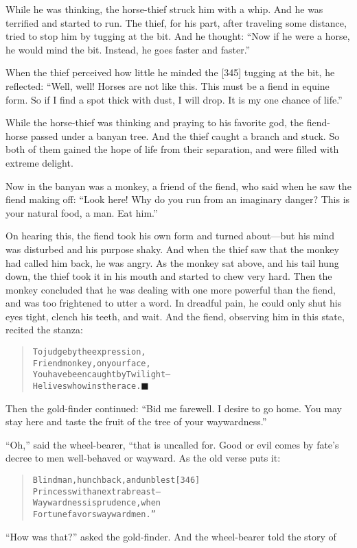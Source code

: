\documentclass[article, twoside, 14pt]{memoir}
\newcommand{\qed}{\hfill \ensuremath{\blacksquare}}
\renewenvironment{verbatim}{%
\begin{quote}%
\vskip -10pt%
\begin{alltt}\normalfont\large}{\end{alltt}%
\end{quote}%
\vskip -10pt
} %
\begin{document}
While he was thinking, the horse-thief struck him with a whip. And
he was terrified and started to run. The thief, for his part, after
traveling some distance, tried to stop him by tugging at the bit.
And he thought:
``Now if he were a horse, he would mind the bit. Instead, he goes faster and faster.''

When the thief perceived how little he minded the [345] tugging at
the bit, he reflected:
``Well, well! Horses are not like this. This must be a fiend in equine form. So if I find a spot thick with dust, I will drop. It is my one chance of life.''

While the horse-thief was thinking and praying to his favorite god,
the fiend-horse passed under a banyan tree. And the thief caught a
branch and stuck. So both of them gained the hope of life from
their separation, and were filled with extreme delight.

Now in the banyan was a monkey, a friend of the fiend, who said
when he saw the fiend making off:
``Look here! Why do you run from an imaginary danger? This is your natural food, a man. Eat him.''

On hearing this, the fiend took his own form and turned about---but
his mind was disturbed and his purpose shaky. And when the thief
saw that the monkey had called him back, he was angry. As the
monkey sat above, and his tail hung down, the thief took it in his
mouth and started to chew very hard. Then the monkey concluded that
he was dealing with one more powerful than the fiend, and was too
frightened to utter a word. In dreadful pain, he could only shut
his eyes tight, clench his teeth, and wait. And the fiend,
observing him in this state, recited the stanza:

\begin{verbatim}
To judge by the expression,
    Friend monkey, on your face,
You have been caught by Twilight--
    He lives who wins the race.\hyperref[s88]{\qed}
\end{verbatim}
Then the gold-finder continued:
``Bid me farewell. I desire to go home. You may stay here and taste the fruit of the tree of your waywardness.''

``Oh,'' said the wheel-bearer, “that is uncalled for. Good or evil
comes by fate's decree to men well-behaved or wayward. As the old
verse puts it:

\begin{verbatim}
Blind man, hunchback, and unblest                       [346]
Princess with an extra breast--
Waywardness is prudence, when
Fortune favors wayward men.”
\end{verbatim}
``How was that?'' asked the gold-finder. And the wheel-bearer told
the story of
\end{document}
